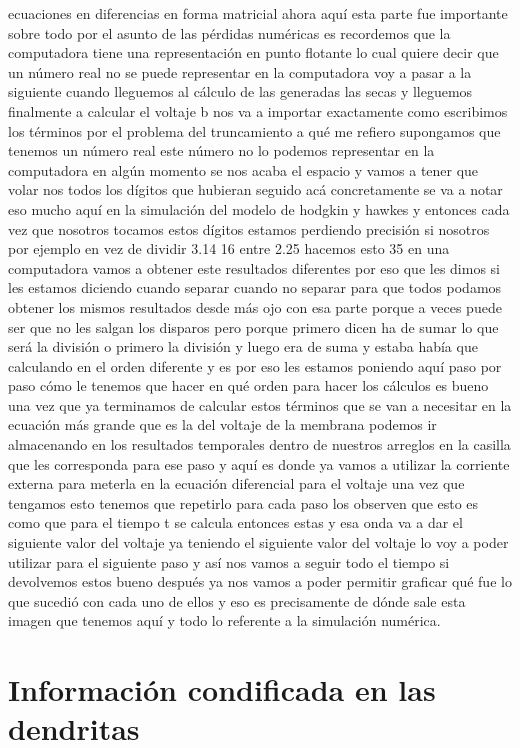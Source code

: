 ecuaciones en diferencias en forma matricial ahora aquí esta parte fue importante sobre todo por el asunto de las pérdidas numéricas es recordemos que la computadora tiene una representación en punto flotante lo cual quiere decir que un número real no se puede representar en la computadora voy a pasar a la siguiente cuando lleguemos al cálculo de las generadas las secas y lleguemos finalmente a calcular el voltaje b nos va a importar exactamente como escribimos los términos por el problema del truncamiento a qué me refiero supongamos que tenemos un número real este número no lo podemos representar en la computadora en algún momento se nos acaba el espacio y vamos a tener que volar nos todos los dígitos que hubieran seguido acá concretamente se va a notar eso mucho aquí en la simulación del modelo de hodgkin y hawkes y entonces cada vez que nosotros tocamos estos dígitos estamos perdiendo precisión si nosotros por ejemplo en vez de dividir 3.14 16 entre 2.25 hacemos esto 35 en una computadora vamos a obtener este resultados diferentes por eso que les dimos si les estamos diciendo cuando separar cuando no separar para que todos podamos obtener los mismos resultados desde más ojo con esa parte porque a veces puede ser que no les salgan los disparos pero porque primero dicen ha de sumar lo que será la división o primero la división y luego era de suma y estaba había que calculando en el orden diferente y es por eso les estamos poniendo aquí paso por paso cómo le tenemos que hacer en qué orden para hacer los cálculos es bueno una vez que ya terminamos de calcular estos términos que se van a necesitar en la ecuación más grande que es la del voltaje de la membrana podemos ir almacenando en los resultados temporales dentro de nuestros arreglos en la casilla que les corresponda para ese paso y aquí es donde ya vamos a utilizar la corriente externa para meterla en la ecuación diferencial para el voltaje una vez que tengamos esto tenemos que repetirlo para cada paso los observen que esto es como que para el tiempo t se calcula entonces estas y esa onda va a dar el siguiente valor del voltaje ya teniendo el siguiente valor del voltaje lo voy a poder utilizar para el siguiente paso y así nos vamos a seguir todo el tiempo si devolvemos estos bueno después ya nos vamos a poder permitir graficar qué fue lo que sucedió con cada uno de ellos y eso es precisamente de dónde sale esta imagen que tenemos aquí y todo lo referente a la simulación numérica.

\section{Información condificada en las dendritas}

